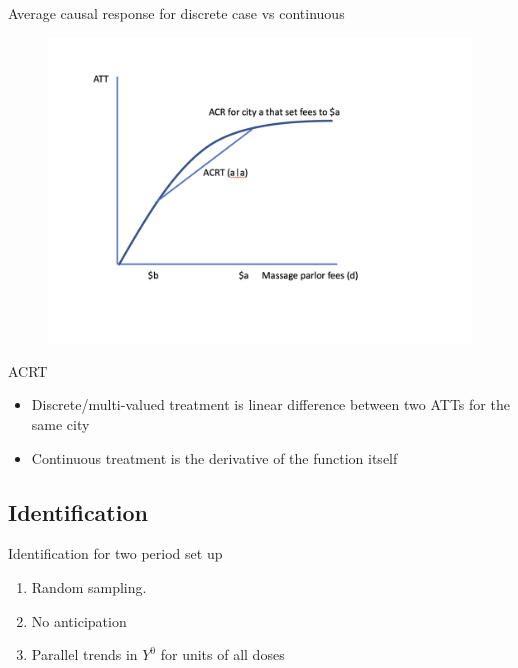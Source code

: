 \documentclass{beamer}
\begin{document}
\begin{frame}{Average causal response for discrete case vs continuous}

\begin{figure}
\begin{center}
             \includegraphics[scale=0.3]{./lecture_includes/acrt_fig3.png}
\end{center}
\end{figure}

\end{frame}

\begin{frame}{ACRT}

\begin{itemize}
\item Discrete/multi-valued treatment is linear difference between two ATTs for the same city
\item Continuous treatment is the derivative of the function itself
\end{itemize}

\end{frame}

\subsection{Identification}

\begin{frame}{Identification for two period set up}

\begin{enumerate}

\item Random sampling.  
\item No anticipation
\item Parallel trends in $Y^0$ for units of all doses

\end{enumerate}

\end{frame}
\end{document}
